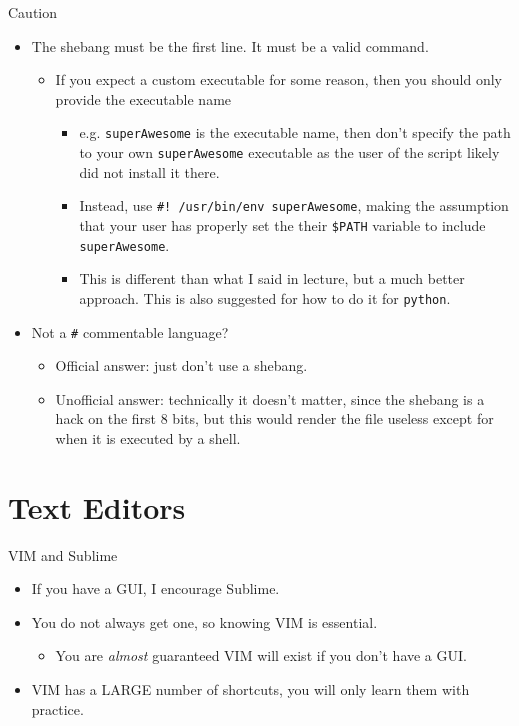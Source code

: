 \begin{frame}[fragile]{Caution}
  \begin{itemize}[<+- | alert@+>]
    \item The shebang must be the first line.  It must be a valid command.
    \begin{itemize}[<+- | alert@+>]
      \item If you expect a custom executable for some reason, then you should only provide the executable name
      \begin{itemize}[<+- | alert@+>]
        \item e.g. \texttt{superAwesome} is the executable name, then don't specify the path to your own
              \texttt{superAwesome} executable as the user of the script likely did not install it there.
        \item Instead, use \texttt{\#! /usr/bin/env superAwesome}, making the assumption that your user has
              properly set the their \texttt{\$PATH} variable to include \texttt{superAwesome}.
        \item This is different than what I said in lecture, but a much better approach.  This is also suggested
              for how to do it for \texttt{python}.
      \end{itemize}
    \end{itemize}
    \item Not a \texttt{\#} commentable language?
    \begin{itemize}[<+- | alert@+>]
      \item Official answer: just don't use a shebang.
      \item Unofficial answer: technically it doesn't matter, since the shebang is a hack on the first 8 bits,
            but this would render the file useless except for when it is executed by a shell.
    \end{itemize}
  \end{itemize}
\end{frame}

%

%
\section{Text Editors}
\label{sec:text_editors}

\begin{frame}[fragile]{VIM and Sublime}
  \begin{itemize}[<+- | alert@+>]
    \item If you have a GUI, I encourage Sublime.
    \item You do not always get one, so knowing VIM is essential.
    \begin{itemize}[<+- | alert@+>]
      \item You are \emph{almost} guaranteed VIM will exist if you don't have a GUI.
    \end{itemize}
    \item VIM has a LARGE number of shortcuts, you will only learn them with practice.
  \end{itemize}
\end{frame}

